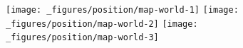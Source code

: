 \begin{itemize}
\begin{Shaded}
\begin{Highlighting}[]
\StringTok{ }\NormalTok{()}
\StringTok{ }\NormalTok{(}\NormalTok{)}
\StringTok{ }\NormalTok{(}\NormalTok{)}
\end{Highlighting}
\end{Shaded}

  \begin{figure}[H]
    \texttt{[image: \_figures/position/map-world-1]}%
    \texttt{[image: \_figures/position/map-world-2]}%
    \texttt{[image: \_figures/position/map-world-3]}
  \end{figure}
\end{itemize}
